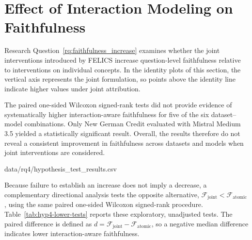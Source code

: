 \section{Effect of Interaction Modeling on Faithfulness}
\label{sec:results-faithfulness-increase}

Research Question~\ref{rq:faithfulness_increase} examines whether the joint interventions introduced by FELICS increase question-level faithfulness relative to interventions on individual concepts. In the identity plots of this section, the vertical axis represents the joint formulation, so points above the identity line indicate higher values under joint attribution.

The paired one-sided Wilcoxon signed-rank tests did not provide evidence of systematically higher interaction-aware faithfulness for five of the six dataset--model combinations. Only New German Credit evaluated with Mistral Medium 3.5 yielded a statistically significant result. Overall, the results therefore do not reveal a consistent improvement in faithfulness across datasets and models when joint interventions are considered.

  {data/rq4/hypothesis_test_results.csv}

Because failure to establish an increase does not imply a decrease, a
complementary directional analysis tests the opposite alternative,
$\mathcal{F}_{\mathrm{joint}}<\mathcal{F}_{\mathrm{atomic}}$, using the same
paired one-sided Wilcoxon signed-rank procedure. Table~\ref{tab:hyp4-lower-tests}
reports these exploratory, unadjusted tests. The paired difference is defined as
$d=\mathcal{F}_{\mathrm{joint}}-\mathcal{F}_{\mathrm{atomic}}$, so a negative
median difference indicates lower interaction-aware faithfulness.

